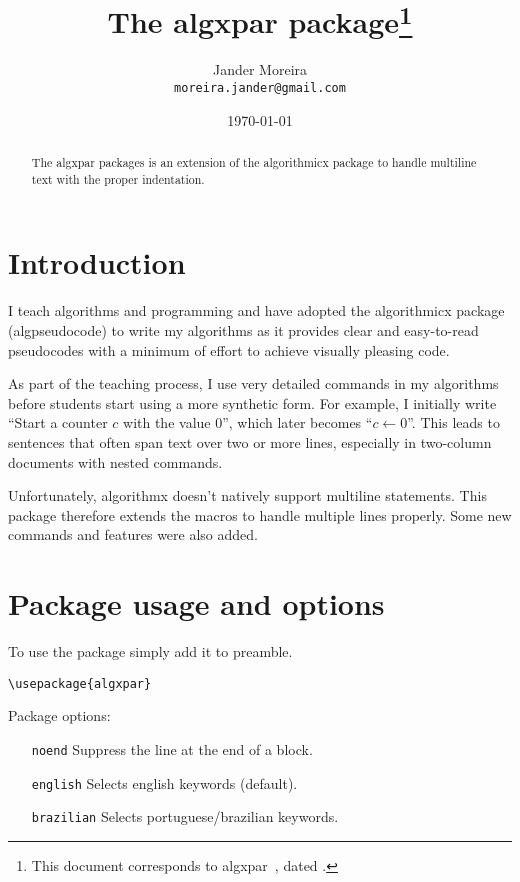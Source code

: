 \documentclass[12pt]{ltxdoc}
\title{The \textsf{algxpar} package\thanks{This document corresponds to \textsf{algxpar}~\AlgVersion, dated \AlgDate.}}
\author{Jander Moreira\\\texttt{moreira.jander@gmail.com}}
\date{\today}
\begin{document}
\maketitle

\begin{abstract}
    The \textsf{algxpar} packages is an extension of the \textsf{algorithmicx} package to handle multiline text with the proper indentation.
\end{abstract}

\tableofcontents
\vspace{2em}



\section{Introduction}
I teach algorithms and programming and have adopted the \textsf{algorithmicx} package (\textsf{algpseudocode}) to write my algorithms as it provides clear and easy-to-read pseudocodes with a minimum of effort to achieve visually pleasing code.

As part of the teaching process, I use very detailed commands in my algorithms before students start using a more synthetic form. For example, I initially write ``Start a counter $c$ with the value $0$'', which later becomes ``${c \gets 0}$''. This leads to sentences that often span text over two or more lines, especially in two-column documents with nested commands.

Unfortunately, \textsf{algorithmx} doesn't natively support multiline statements. This package therefore extends the macros to handle multiple lines properly. Some new commands and features were also added.


\section{Package usage and options}
To use the package simply add it to preamble.

\begin{verbatim}
\usepackage{algxpar}
\end{verbatim}

Package options:
\begin{itemize}
    \item[\texttt{noend}] Suppress the line at the end of a block.
    \item[\texttt{english}] Selects english keywords (default).
    \item[\texttt{brazilian}] Selects portuguese/brazilian keywords.
\end{itemize}
\end{document}
